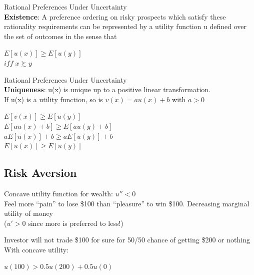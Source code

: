 \documentclass[
14pt,notheorems,hyperref={pdfauthor=whatever}
]{beamer}
\begin{document}
\begin{frame}
Rational Preferences Under Uncertainty\\
\hfill \break
\textbf{Existence}: A preference ordering on risky prospects which satisfy these rationality requirements can be represented by a utility function u defined over the set of outcomes in the sense that\\
\hfill \break
\begin{center}
    $E[u(x)] \geq E[u(y)]$\\
    $iff\;x \succsim y$\\
\end{center}
\end{frame}

\begin{frame}
Rational Preferences Under Uncertainty\\
\hfill \break
\textbf{Uniqueness}: u(x) is unique up to a positive linear transformation.\\
\hfill \break
If u(x) is a utility function, so is $v(x)=au(x)+b$ with $a>0$ \\
\begin{center}
    $E[v(x)] \geq E[u(y)]$\\
    $E[au(x)+b] \geq E[au(y)+b]$\\
    $aE[u(x)]+b \geq aE[u(y)]+b$\\
    $E[u(x)] \geq E[u(y)]$\\
\end{center}
\end{frame}


\subsection{Risk Aversion}

\begin{frame}
Concave utility function for wealth: $u''<0$\\
\hfill \break
Feel more “pain” to lose \$100 than “pleasure” to win \$100. Decreasing marginal utility of money\\
\hfill \break
($u'>0$ since more is preferred to less!)\\
\end{frame}

\begin{frame}
Investor will not trade \$100 for sure for 50/50 chance of getting \$200 or nothing\\
\hfill \break
With concave utility:\\
\begin{center}
    $u(100) > 0.5 u(200) + 0.5 u(0)$\\
\end{center}
\end{frame}
\end{document}
